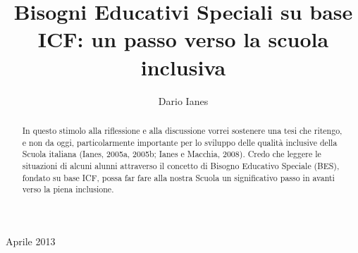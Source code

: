 \author{Dario Ianes}
\title{Bisogni Educativi Speciali su base ICF: un passo verso la scuola inclusiva}
\label{cha:scataglini170613}
\begin{abstract}
In questo stimolo alla riflessione e alla discussione vorrei sostenere una tesi che ritengo, e non
da oggi, particolarmente importante per lo sviluppo delle qualità inclusive della Scuola italiana
(Ianes, 2005a, 2005b; Ianes e Macchia, 2008). Credo che leggere le situazioni di alcuni alunni
attraverso il concetto di Bisogno Educativo Speciale (BES), fondato su base ICF, possa far fare alla
nostra Scuola un significativo passo in avanti verso la piena inclusione.
\end{abstract}
\maketitle
\null\vspace*{-3cm}
\begin{center}
Aprile 2013
\end{center}
\vspace*{0.3cm}\null


